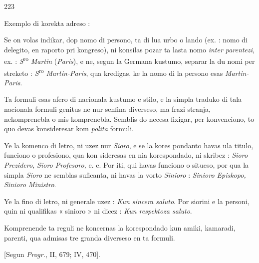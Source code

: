 \begin{VUpage}[227]{223}
\VUornement[17.10mm]{159.09mm}

Exemplo di korekta adreso :

\VUblanc{1.94mm}
\VUblanc{0.60mm}
\VUblanc{0.58mm}
\VUblanc{1.96mm}

Se on volas indikar, dop nomo di persono, ta di lua urbo\nl
o lando (ex. : nomo di delegito, en raporto pri kongreso), ni\nl
konsilas pozar ta lasta nomo \textit{inter parentezi}, ex. : \textit{S}\textsuperscript{ro} \textit{Martin}\nl
(\textit{Paris}), e ne, segun la Germana kustumo, separar la du nomi\nl
per streketo : \textit{S}\textsuperscript{ro} \textit{Martin-Paris}, qua kredigas, ke la nomo di\nl
la persono esas \textit{Martin-Paris}.

\VUsaut{5.99mm}
\VUfilet{8.38mm}
\VUsaut{3.20mm}
\VUsaut{1.21mm}
\VUsaut{4.24mm}

Ta formuli esas afero di nacionala kustumo e stilo, e la\nl
simpla traduko di tala nacionala formuli genitus ne nur\nl
senfina diverseso, ma frazi stranja, nekomprenebla o mis\cc
komprenebla. Semblis do necesa fixigar, per konvenciono,\nl
to quo devas konsideresar kom \textit{polita} formuli.

Ye la komenco di letro, ni uzez nur \textit{Sioro}, e se la kores\cc
pondanto havas ula titulo, funciono o profesiono, qua kon\cc
sideresas en nia korespondado, ni skribez : \textit{Sioro Prezidero,}\nl
\textit{Sioro Profesoro,} e. c. Por iti, qui havas funciono o situeso,\nl
por qua la simpla \textit{Sioro} ne semblas suficanta, ni havas la\nl
vorto \textit{Sinioro} : \textit{Sinioro Episkopo, Sinioro Ministro}.

Ye la fino di letro, ni generale uzez : \textit{Kun sincera saluto}.\nl
Por siorini e la personi, quin ni qualifikas « sinioro » ni\nl
dicez : \textit{Kun respektoza saluto}.

Komprenende ta reguli ne koncernas la korespondado kun\nl
amiki, kamaradi, parenti, qua admisas tre granda diverseso\nl
en ta formuli.

[Segun \textit{Progr.}, II, 679; IV, 470].
\end{VUpage}

